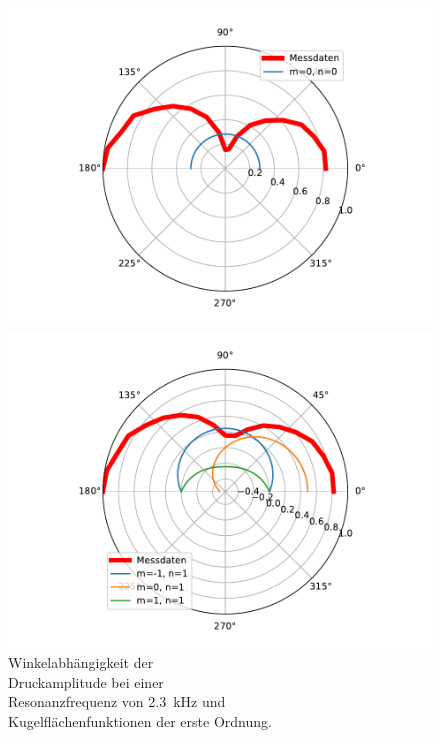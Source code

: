 \FloatBarrier
\begin{figure}
    \hspace*{2cm}
    \begin{minipage}[b]{.4\linewidth} %
        \hspace*{-2cm}
        \includegraphics[width=\linewidth]{figure/9mmZwischenring_n0.pdf}
        \caption{Winkelabhängigkeit der\\ Druckamplitude bei einer \\ Resonanzfrequenz von \SI{2.3}{\kilo\hertz} und \\ Kugelflächenfunktionen der nullten Ordnung.}
     \end{minipage}
     \hspace{.1\linewidth}%
     \begin{minipage}[b]{.4\linewidth} %
        \hspace*{-2cm}
        \includegraphics[width=\linewidth]{figure/9mmZwischenring_n1.pdf}
        \caption{Winkelabhängigkeit der\\ Druckamplitude bei einer \\ Resonanzfrequenz von \SI{2.3}{\kilo\hertz} und \\ Kugelflächenfunktionen der erste Ordnung.}
     \end{minipage}
\end{figure}
